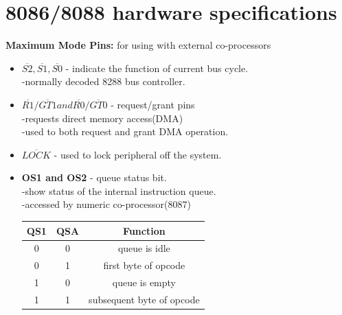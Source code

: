 \documentclass[12pt]{article}
\begin{document}
\newpage

\section{8086/8088 hardware specifications}
\textbf{Maximum Mode Pins:} for using with external co-processors \\
\begin{itemize}
	\item$\overline{S2}, \overline{S1}, \overline{S0}$ - indicate the function of current bus cycle.\\
	-normally decoded 8288 bus controller.\\
	
	\item $\overline{R1}/\overline{GT1} and \overline{R0}/\overline{GT0}$ - request/grant pins \\
	-requests direct memory access(DMA)\\
	-used to both request and grant DMA operation.\\
	
	\item\textbf{$\overline{LOCK}$} - used to lock peripheral off the system.\\
	
	\item \textbf{OS1 and OS2} - queue status bit.\\
	-show status of the internal instruction queue.\\
	-accessed by numeric co-processor(8087)\\
	
	\begin{table}[H]
		\centering
		\begin{tabular}{|c|c|c|}
			\hline
			QS1 & QSA & Function\\\hline
			0 & 0 & queue is idle\\\hline
			0 & 1 & first byte of opcode\\\hline
			1 & 0 & queue is empty\\\hline
			1 & 1 & subsequent byte of opcode\\\hline
		\end{tabular}
	\end{table} 
\end{itemize}
\end{document}
